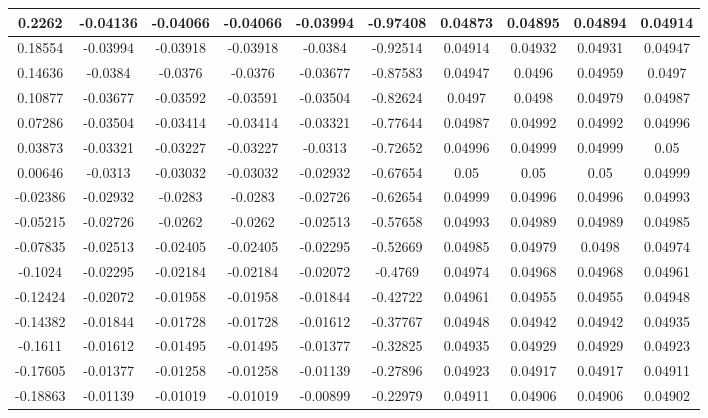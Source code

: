 \begin{table}
	\begin{center}
		\begin{tabular}{c|c|c|c|c|c|c|c|c|c}
			0.2262 & -0.04136 & -0.04066 & -0.04066 & -0.03994 & -0.97408 & 0.04873 & 0.04895 & 0.04894 & 0.04914 \\
			\hline
			0.18554 & -0.03994 & -0.03918 & -0.03918 & -0.0384 & -0.92514 & 0.04914 & 0.04932 & 0.04931 & 0.04947 \\
			\hline
			0.14636 & -0.0384 & -0.0376 & -0.0376 & -0.03677 & -0.87583 & 0.04947 & 0.0496 & 0.04959 & 0.0497 \\
			\hline
			0.10877 & -0.03677 & -0.03592 & -0.03591 & -0.03504 & -0.82624 & 0.0497 & 0.0498 & 0.04979 & 0.04987 \\
			\hline
			0.07286 & -0.03504 & -0.03414 & -0.03414 & -0.03321 & -0.77644 & 0.04987 & 0.04992 & 0.04992 & 0.04996 \\
			\hline
			0.03873 & -0.03321 & -0.03227 & -0.03227 & -0.0313 & -0.72652 & 0.04996 & 0.04999 & 0.04999 & 0.05 \\
			\hline
			0.00646 & -0.0313 & -0.03032 & -0.03032 & -0.02932 & -0.67654 & 0.05 & 0.05 & 0.05 & 0.04999 \\
			\hline
			-0.02386 & -0.02932 & -0.0283 & -0.0283 & -0.02726 & -0.62654 & 0.04999 & 0.04996 & 0.04996 & 0.04993 \\
			\hline
			-0.05215 & -0.02726 & -0.0262 & -0.0262 & -0.02513 & -0.57658 & 0.04993 & 0.04989 & 0.04989 & 0.04985 \\
			\hline
			-0.07835 & -0.02513 & -0.02405 & -0.02405 & -0.02295 & -0.52669 & 0.04985 & 0.04979 & 0.0498 & 0.04974 \\
			\hline
			-0.1024 & -0.02295 & -0.02184 & -0.02184 & -0.02072 & -0.4769 & 0.04974 & 0.04968 & 0.04968 & 0.04961 \\
			\hline
			-0.12424 & -0.02072 & -0.01958 & -0.01958 & -0.01844 & -0.42722 & 0.04961 & 0.04955 & 0.04955 & 0.04948 \\
			\hline
			-0.14382 & -0.01844 & -0.01728 & -0.01728 & -0.01612 & -0.37767 & 0.04948 & 0.04942 & 0.04942 & 0.04935 \\
			\hline
			-0.1611 & -0.01612 & -0.01495 & -0.01495 & -0.01377 & -0.32825 & 0.04935 & 0.04929 & 0.04929 & 0.04923 \\
			\hline
			-0.17605 & -0.01377 & -0.01258 & -0.01258 & -0.01139 & -0.27896 & 0.04923 & 0.04917 & 0.04917 & 0.04911 \\
			\hline
			-0.18863 & -0.01139 & -0.01019 & -0.01019 & -0.00899 & -0.22979 & 0.04911 & 0.04906 & 0.04906 & 0.04902 \\

\end{tabular}
\end{center}
\end{table}
